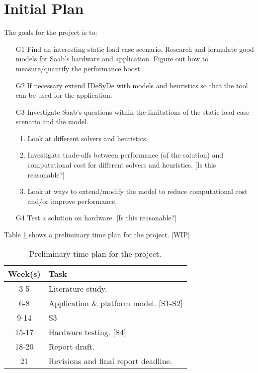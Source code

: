 \documentclass[12pt,notitlepage]{article}
\begin{document}
\section{Initial Plan}
The goals for the project is to:
\begin{enumerate}
	\item[G1] Find an interesting static load case scenario. Research and formulate good models for Saab's hardware and application. Figure out how to measure/quantify the performance boost.
	\item[G2] If necessary extend IDeSyDe with models and heuristics so that the tool can be used for the application.
	\item[G3] Investigate Saab's questions within the limitations of the static load case scenario and the model.
	\begin{enumerate}
		\item Look at different solvers and heuristics.
		\item Investigate trade-offs between performance (of the solution) and computational cost for different solvers and heuristics. [Is this reasonable?]
		\item Look at ways to extend/modify the model to reduce computational cost and/or improve performance.
	\end{enumerate}
	\item[G4] Test a solution on hardware. [Is this reasonable?]
\end{enumerate}

Table \ref{timeplan} shows a preliminary time plan for the project. [WIP]

\begin{table}[H]
	\centering
	\begin{tabular}{c|l}
		Week(s) & Task \\
		\hline
		3-5 & Literature study. \\
		6-8 & Application \& platform model. [S1-S2] \\
		9-14 & S3 \\
		15-17 & Hardware testing. [S4] \\
		18-20 & Report draft. \\
		21 & Revisions and final report deadline.
	\end{tabular}
    \caption{Preliminary time plan for the project.}
	\label{timeplan}
\end{table}
\end{document}
